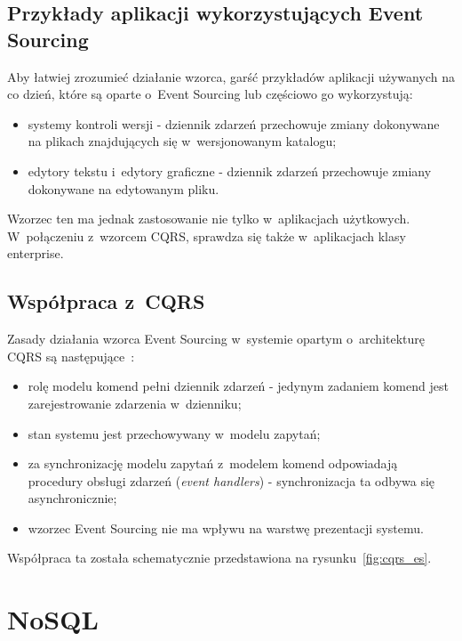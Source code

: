 \subsection{Przykłady aplikacji wykorzystujących Event Sourcing}

Aby łatwiej zrozumieć działanie wzorca, garść przykładów aplikacji używanych na co dzień, które są oparte o~Event Sourcing lub częściowo go wykorzystują:

\begin{itemize}
 \item systemy kontroli wersji - dziennik zdarzeń przechowuje zmiany dokonywane na plikach znajdujących się w~wersjonowanym katalogu;
 \item edytory tekstu i~edytory graficzne - dziennik zdarzeń przechowuje zmiany dokonywane na edytowanym pliku.
\end{itemize}

Wzorzec ten ma jednak zastosowanie nie tylko w~aplikacjach użytkowych.
W~połączeniu z~wzorcem CQRS, sprawdza się także w~aplikacjach klasy enterprise.


\subsection{Współpraca z~CQRS}

Zasady działania wzorca Event Sourcing w~systemie opartym o~architekturę CQRS są następujące~\cite{cqrs_es}:

\begin{itemize}
 \item rolę modelu komend pełni dziennik zdarzeń - jedynym zadaniem komend jest zarejestrowanie zdarzenia w~dzienniku;
 \item stan systemu jest przechowywany w~modelu zapytań;
 \item za synchronizację modelu zapytań z~modelem komend odpowiadają procedury obsługi zdarzeń (\emph{event handlers}) - synchronizacja ta odbywa się asynchronicznie;
 \item wzorzec Event Sourcing nie ma wpływu na warstwę prezentacji systemu.
\end{itemize}


Współpraca ta została schematycznie przedstawiona na rysunku~\ref{fig:cqrs_es}.





\section{NoSQL}

